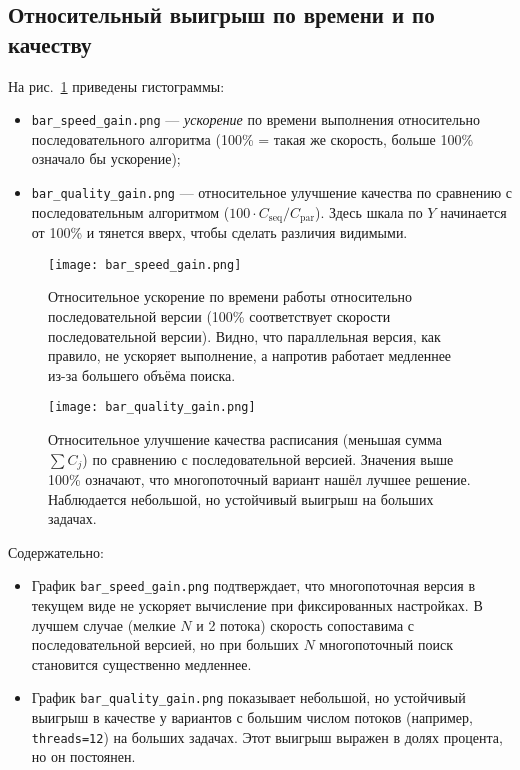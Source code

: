\documentclass[a4paper,12pt]{article}
\begin{document}
\subsection{Относительный выигрыш по времени и по качеству}

На рис.~\ref{fig:speed_quality_gain} приведены гистограммы:
\begin{itemize}
    \item \texttt{bar\_speed\_gain.png} --- \emph{ускорение} по времени выполнения относительно последовательного алгоритма (100\% = такая же скорость, больше 100\% означало бы ускорение);
    \item \texttt{bar\_quality\_gain.png} --- относительное улучшение качества по сравнению с последовательным алгоритмом (\(100 \cdot C_{\text{seq}} / C_{\text{par}}\)). Здесь шкала по $Y$ начинается от 100\% и тянется вверх, чтобы сделать различия видимыми.
\end{itemize}

\begin{figure}[h!]
    \centering
    \texttt{[image: bar\_speed\_gain.png]}
    \caption{Относительное ускорение по времени работы относительно последовательной версии
    (100\% соответствует скорости последовательной версии). 
    Видно, что параллельная версия, как правило, не ускоряет выполнение, 
    а напротив работает медленнее из-за большего объёма поиска.}
\end{figure}

\begin{figure}[h!]
    \centering
    \texttt{[image: bar\_quality\_gain.png]}
    \caption{Относительное улучшение качества расписания (меньшая сумма $\sum C_j$) 
    по сравнению с последовательной версией. Значения выше 100\% означают,
    что многопоточный вариант нашёл лучшее решение.
    Наблюдается небольшой, но устойчивый выигрыш на больших задачах.}
    \label{fig:speed_quality_gain}
\end{figure}


Содержательно:
\begin{itemize}
    \item График \texttt{bar\_speed\_gain.png} подтверждает, что многопоточная версия в текущем виде не ускоряет вычисление при фиксированных настройках. В лучшем случае (мелкие $N$ и 2 потока) скорость сопоставима с последовательной версией, но при больших $N$ многопоточный поиск становится существенно медленнее.
    \item График \texttt{bar\_quality\_gain.png} показывает небольшой, но устойчивый выигрыш в качестве у вариантов с большим числом потоков (например, \texttt{threads=12}) на больших задачах. Этот выигрыш выражен в долях процента, но он постоянен.
\end{itemize}
\end{document}
